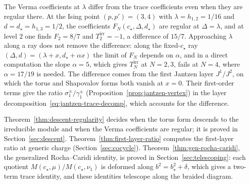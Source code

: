 \documentclass[twoside,10pt]{article}
\numberwithin{equation}{section}
\theoremstyle{slbody}
\theoremstyle{definition}
\theoremstyle{remark}
\begin{document}
The Verma coefficients at \(\lambda\) differ from the trace coefficients
even when they are regular there.  At the Ising point \((p,p')=(3,4)\) with
\(\lambda=h_{1,2}=1/16\) and \(d=d_\star=h_{1,3}=1/2\), the coefficients
\(F_N(c_\star,\Delta,d_\star)\) are regular at \(\Delta=\lambda\), and at
level \(2\) one finds \(F_2=8/7\) and \(T^{\mathrm{irr}}_2=-1\), a difference
of \(15/7\).  Approaching \(\lambda\) along a ray does not remove the
difference: along the fixed-\(c_\star\) ray
\((\Delta,d)=(\lambda+x,d_\star+\alpha x)\) the limit of \(F_N\) depends on
\(\alpha\), and in a direct computation the slope \(\alpha=5\), which gives
\(T^{\mathrm{irr}}_N\) at \(N=2,3\), fails at \(N=4\), where
\(\alpha=17/19\) is needed.  The difference comes from the first Jantzen layer
\(J^1/J^2\), on which the torus and Shapovalov forms both vanish at \(x=0\).
Their first-order terms give the ratio \(\sigma^\pm_1/\gamma^\pm_1\)
(Proposition~\ref{prop:jantzen-vertex}) in the layer
decomposition~\eqref{eq:jantzen-trace-decomp}, which accounts for the
difference.

Theorem~\ref{thm:descent-regularity} decides when
the torus form descends to the irreducible module and when the Verma
coefficients are regular; it is proved in Section~\ref{sec:descent}.
Theorem~\ref{thm:first-layer-ratio} computes the first-layer ratio at generic
charge (Section~\ref{sec:cocycle}).  Theorem~\ref{thm:gen-rocha-caridi}, the
generalized Rocha--Caridi identity, is proved in
Section~\ref{sec:telescoping}: each quotient
\(M(c_\star,\mu)/M(c_\star,\nu_1)\) is deformed along
\(b^2=b_\star^2+\delta\), which gives a two-term trace identity, and these
identities telescope along the braided diagram.
\end{document}
